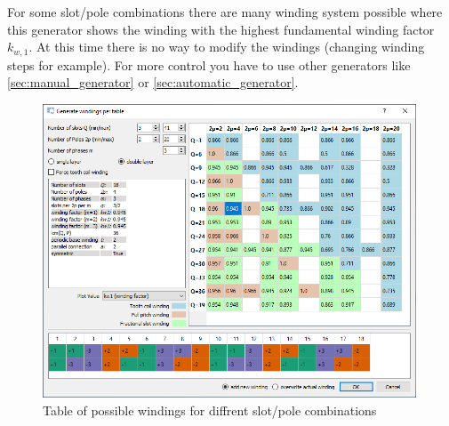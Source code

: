 \documentclass[]{scrreprt}
\begin{document}
For some slot/pole combinations there
are many winding system possible where this generator shows the winding with the highest
fundamental winding factor $k_{w,1}$. At this time there is no way to modify the windings
(changing winding steps for example). For more control you have to use other generators like
\ref{sec:manual_generator} or \ref{sec:automatic_generator}.
%
\begin{figure}[htpb]
    \centering
    \includegraphics[width=0.99\textwidth,angle=0]{fig/winding_table}
    \caption{Table of possible windings for diffrent slot/pole combinations }
    \label{fig:winding_table}
\end{figure}
%
%
\end{document}
